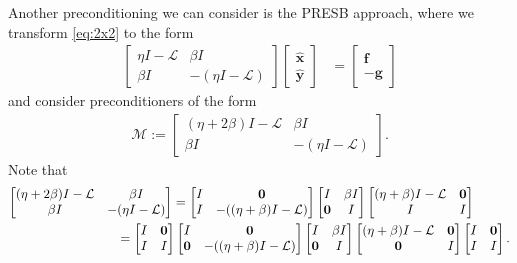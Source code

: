 \documentclass[a4paper,10pt]{article}
\begin{document}
Another preconditioning we can consider is the PRESB approach, where we transform
\eqref{eq:2x2} to the form
%
\begin{align}
\begin{bmatrix} \eta I - \mathcal{L} & \beta I\\ \beta I & -(\eta I - \mathcal{L}) \end{bmatrix}
	\begin{bmatrix} \hat{\mathbf{x}}\\\hat{\mathbf{y}}\end{bmatrix} & =
	\begin{bmatrix} \mathbf{f}\\-\mathbf{g}\end{bmatrix}\label{eq:2x2_neg}
\end{align}
%
and consider preconditioners of the form
%
\begin{align*}
\mathcal{M} := \begin{bmatrix} (\eta + 2\beta)I - \mathcal{L} & \beta I
	\\ \beta I & -(\eta I - \mathcal{L}) \end{bmatrix}.
\end{align*}
%
Note that
%
\begin{align*}
\begin{bmatrix} (\eta+2\beta)I - \mathcal{L} & \beta I
	\\ \beta I & -(\eta I - \mathcal{L}) \end{bmatrix} & = 
	\begin{bmatrix} I & \mathbf{0} \\ I & -( (\eta+\beta)I - \mathcal{L}) \end{bmatrix}
	\begin{bmatrix} I & \beta I	\\ \mathbf{0} & I \end{bmatrix}
	\begin{bmatrix} (\eta+\beta)I - \mathcal{L} & \mathbf{0} \\ I & I \end{bmatrix} \\
& \hspace{-10ex} =
	\begin{bmatrix} I & \mathbf{0} \\ I & I \end{bmatrix}
	\begin{bmatrix} I & \mathbf{0} \\ \mathbf{0} & -( (\eta+\beta)I - \mathcal{L}) \end{bmatrix}
	\begin{bmatrix} I & \beta I	\\ \mathbf{0} & I \end{bmatrix}
	\begin{bmatrix} (\eta+\beta)I - \mathcal{L} & \mathbf{0} \\ \mathbf{0} & I \end{bmatrix}
	\begin{bmatrix} I & \mathbf{0} \\ I & I \end{bmatrix}.
\end{align*}
\end{document}
